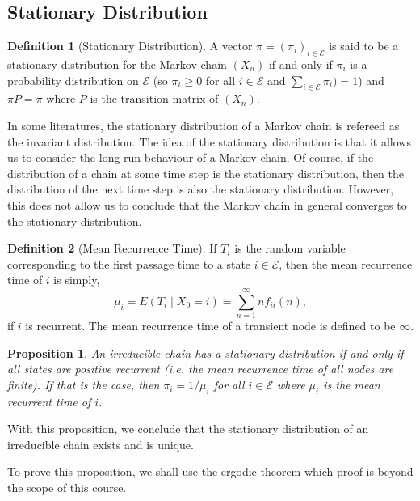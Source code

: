 \documentclass[
]{article}
\newtheorem{prop}{Proposition}[theorem]
\theoremstyle{definition}
\newtheorem{definition}{Definition}[section]
\begin{document}
\hypertarget{stationary-distribution}{%
\subsection{Stationary Distribution}\label{stationary-distribution}}

\begin{definition}[Stationary Distribution]
  A vector \(\pi = (\pi_i)_{i \in \mathcal{E}}\) is said to be a stationary 
  distribution for the Markov chain \((X_n)\) if and only if 
  \(\pi_i\) is a probability distribution on \(\mathcal{E}\) (so \(\pi_i \ge 0\) 
  for all \(i \in \mathcal{E}\) and \(\sum_{i \in \mathcal{E}} \pi_i) = 1\)) and 
  \(\pi P = \pi\) where \(P\) is the transition matrix of \((X_n)\).    
\end{definition}

In some literatures, the stationary distribution of a Markov chain is
refereed as the invariant distribution. The idea of the stationary
distribution is that it allows us to consider the long run behaviour of
a Markov chain. Of course, if the distribution of a chain at some time
step is the stationary distribution, then the distribution of the next
time step is also the stationary distribution. However, this does not
allow us to conclude that the Markov chain in general converges to the
stationary distribution.

\begin{definition}[Mean Recurrence Time]
  If \(T_i\) is the random variable corresponding to the first passage time to a 
  state \(i \in \mathcal{E}\), then the mean recurrence time of \(i\) is simply, 
  \[\mu_i = E(T_i \mid X_0 = i) = \sum_{n = 1}^\infty n f_{ii}(n),\]
  if \(i\) is recurrent. The mean recurrence time of a transient node is defined 
  to be \(\infty\).
\end{definition}

\begin{prop}
  An irreducible chain has a stationary distribution if and only if all states 
  are positive recurrent (i.e. the mean recurrence time of all nodes are finite). 
  If that is the case, then \(\pi_i = 1 / \mu_i\) for all 
  \(i \in \mathcal{E}\) where \(\mu_i\) is the mean recurrent time of \(i\).
\end{prop}

With this proposition, we conclude that the stationary distribution of
an irreducible chain exists and is unique.

To prove this proposition, we shall use the ergodic theorem which proof
is beyond the scope of this course.
\end{document}
